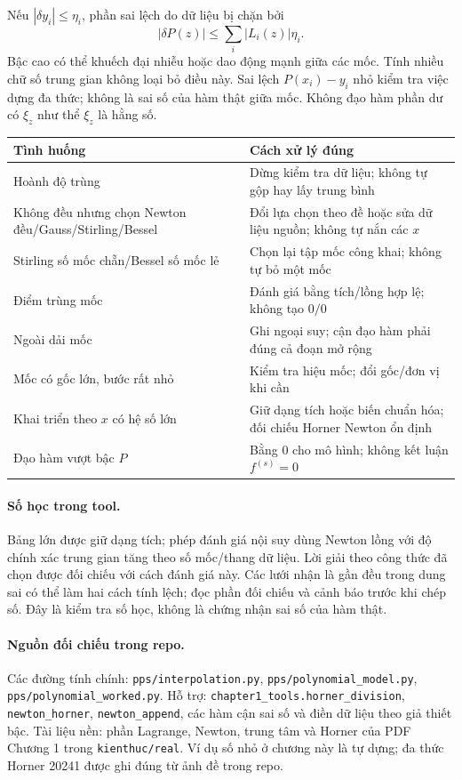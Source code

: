 Nếu $|\delta y_i|\le\eta_i$, phần sai lệch do dữ liệu bị chặn bởi
\[
 |\delta P(z)|\le\sum_i|L_i(z)|\eta_i.
\]
Bậc cao có thể khuếch đại nhiễu hoặc dao động mạnh giữa các mốc. Tính nhiều chữ số trung gian không loại bỏ điều này. Sai lệch $P(x_i)-y_i$ nhỏ kiểm tra việc dựng đa thức; không là sai số của hàm thật giữa mốc. Không đạo hàm phần dư có $\xi_z$ như thể $\xi_z$ là hằng số.

\begin{center}\small
\begin{tabular}{@{}p{.30\linewidth}p{.60\linewidth}@{}}\toprule
Tình huống & Cách xử lý đúng\\\midrule
Hoành độ trùng & Dừng kiểm tra dữ liệu; không tự gộp hay lấy trung bình\\
Không đều nhưng chọn Newton đều/Gauss/Stirling/Bessel & Đổi lựa chọn theo đề hoặc sửa dữ liệu nguồn; không tự nắn các $x$\\
Stirling số mốc chẵn/Bessel số mốc lẻ & Chọn lại tập mốc công khai; không tự bỏ một mốc\\
Điểm trùng mốc & Đánh giá bằng tích/lồng hợp lệ; không tạo $0/0$\\
Ngoài dải mốc & Ghi ngoại suy; cận đạo hàm phải đúng cả đoạn mở rộng\\
Mốc có gốc lớn, bước rất nhỏ & Kiểm tra hiệu mốc; đổi gốc/đơn vị khi cần\\
Khai triển theo $x$ có hệ số lớn & Giữ dạng tích hoặc biến chuẩn hóa; đối chiếu Horner Newton ổn định\\
Đạo hàm vượt bậc $P$ & Bằng 0 cho mô hình; không kết luận $f^{(s)}=0$\\
\bottomrule
\end{tabular}\end{center}

\paragraph{Số học trong tool.} Bảng lớn được giữ dạng tích; phép đánh giá nội suy dùng Newton lồng với độ chính xác trung gian tăng theo số mốc/thang dữ liệu. Lời giải theo công thức đã chọn được đối chiếu với cách đánh giá này. Các lưới nhận là gần đều trong dung sai có thể làm hai cách tính lệch; đọc phần đối chiếu và cảnh báo trước khi chép số. Đây là kiểm tra số học, không là chứng nhận sai số của hàm thật.

\paragraph{Nguồn đối chiếu trong repo.} Các đường tính chính: \texttt{pps/interpolation.py}, \texttt{pps/polynomial\_model.py}, \texttt{pps/polynomial\_worked.py}. Hỗ trợ: \texttt{chapter1\_tools.horner\_division}, \texttt{newton\_horner}, \texttt{newton\_append}, các hàm cận sai số và điền dữ liệu theo giả thiết bậc. Tài liệu nền: phần Lagrange, Newton, trung tâm và Horner của PDF Chương 1 trong \texttt{kienthuc/real}. Ví dụ số nhỏ ở chương này là tự dựng; đa thức Horner 20241 được ghi đúng từ ảnh đề trong repo.
